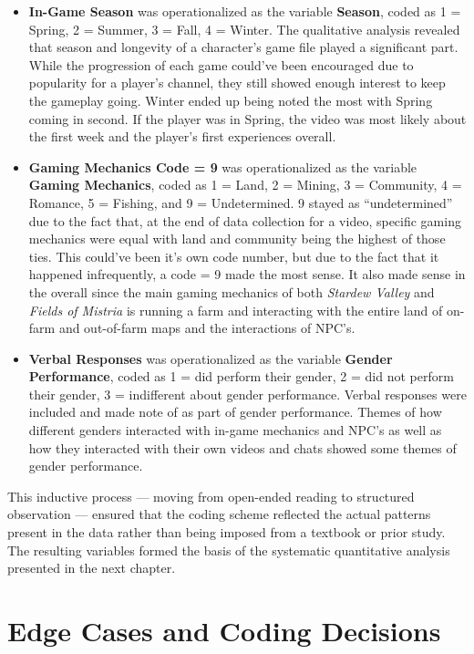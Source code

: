 \documentclass[
  12pt,
  letterpaper,
  DIV=11,
  numbers=noendperiod]{scrreprt}
\begin{document}
\begin{itemize}
\item
  \textbf{In-Game Season} was operationalized as the variable
  \textbf{Season}, coded as 1 = Spring, 2 = Summer, 3 = Fall, 4 =
  Winter. The qualitative analysis revealed that season and longevity of
  a character's game file played a significant part. While the
  progression of each game could've been encouraged due to popularity
  for a player's channel, they still showed enough interest to keep the
  gameplay going. Winter ended up being noted the most with Spring
  coming in second. If the player was in Spring, the video was most
  likely about the first week and the player's first experiences
  overall.
\item
  \textbf{Gaming Mechanics Code = 9} was operationalized as the variable
  \textbf{Gaming Mechanics}, coded as 1 = Land, 2 = Mining, 3 =
  Community, 4 = Romance, 5 = Fishing, and 9 = Undetermined. 9 stayed as
  ``undetermined'' due to the fact that, at the end of data collection
  for a video, specific gaming mechanics were equal with land and
  community being the highest of those ties. This could've been it's own
  code number, but due to the fact that it happened infrequently, a code
  = 9 made the most sense. It also made sense in the overall since the
  main gaming mechanics of both \emph{Stardew Valley} and \emph{Fields
  of Mistria} is running a farm and interacting with the entire land of
  on-farm and out-of-farm maps and the interactions of NPC's.
\item
  \textbf{Verbal Responses} was operationalized as the variable
  \textbf{Gender Performance}, coded as 1 = did perform their gender, 2
  = did not perform their gender, 3 = indifferent about gender
  performance. Verbal responses were included and made note of as part
  of gender performance. Themes of how different genders interacted with
  in-game mechanics and NPC's as well as how they interacted with their
  own videos and chats showed some themes of gender performance.
\end{itemize}

This inductive process --- moving from open-ended reading to structured
observation --- ensured that the coding scheme reflected the actual
patterns present in the data rather than being imposed from a textbook
or prior study. The resulting variables formed the basis of the
systematic quantitative analysis presented in the next chapter.

\section{Edge Cases and Coding
Decisions}\label{edge-cases-and-coding-decisions}
\end{document}
